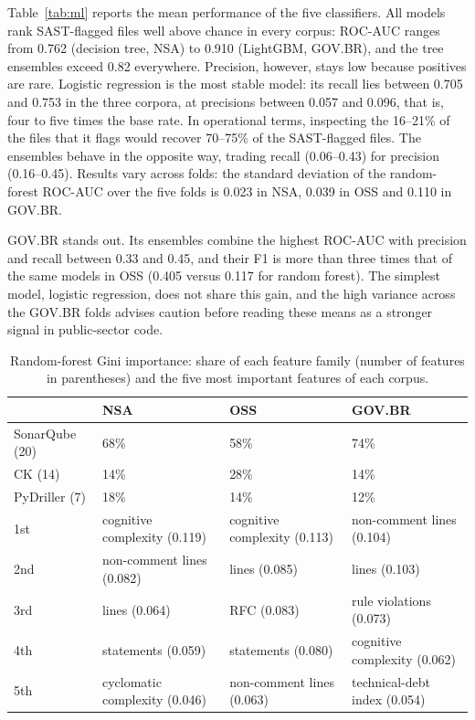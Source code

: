 \documentclass[a4paper,twoside]{article}
\begin{document}
Table~\ref{tab:ml} reports the mean performance of the five classifiers. All models rank SAST-flagged files well above chance in every corpus: ROC-AUC ranges from 0.762 (decision tree, NSA) to 0.910 (LightGBM, GOV.BR), and the tree ensembles exceed 0.82 everywhere. Precision, however, stays low because positives are rare. Logistic regression is the most stable model: its recall lies between 0.705 and 0.753 in the three corpora, at precisions between 0.057 and 0.096, that is, four to five times the base rate. In operational terms, inspecting the 16--21\% of the files that it flags would recover 70--75\% of the SAST-flagged files. The ensembles behave in the opposite way, trading recall (0.06--0.43) for precision (0.16--0.45). Results vary across folds: the standard deviation of the random-forest ROC-AUC over the five folds is 0.023 in NSA, 0.039 in OSS and 0.110 in GOV.BR.

GOV.BR stands out. Its ensembles combine the highest ROC-AUC with precision and recall between 0.33 and 0.45, and their F1 is more than three times that of the same models in OSS (0.405 versus 0.117 for random forest). The simplest model, logistic regression, does not share this gain, and the high variance across the GOV.BR folds advises caution before reading these means as a stronger signal in public-sector code.

\begin{table}[t]
\caption{Random-forest Gini importance: share of each feature family (number of features in parentheses) and the five most important features of each corpus.}\label{tab:importance}
\centering
\footnotesize
\begin{tabular}{@{}llll@{}}
\toprule
 & NSA & OSS & GOV.BR \\
\midrule
SonarQube (20) & 68\% & 58\% & 74\% \\
CK (14) & 14\% & 28\% & 14\% \\
PyDriller (7) & 18\% & 14\% & 12\% \\
\midrule
1st & cognitive complexity (0.119) & cognitive complexity (0.113) & non-comment lines (0.104) \\
2nd & non-comment lines (0.082) & lines (0.085) & lines (0.103) \\
3rd & lines (0.064) & RFC (0.083) & rule violations (0.073) \\
4th & statements (0.059) & statements (0.080) & cognitive complexity (0.062) \\
5th & cyclomatic complexity (0.046) & non-comment lines (0.063) & technical-debt index (0.054) \\
\bottomrule
\end{tabular}
\end{table}
\end{document}
